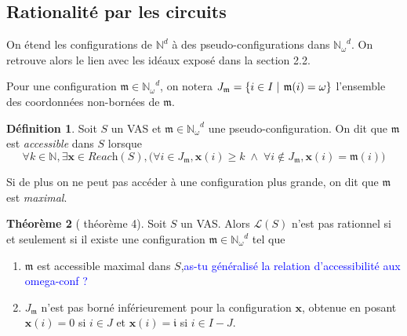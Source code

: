 \documentclass[a4paper,final]{article}
\theoremstyle{definition}
\newtheorem{Theorem}{Théorème}
\newtheorem{Definition}[Theorem]{Définition}
\let\geq\geqslant
\newcommand{\alain}[1]{\textcolor{blue}{#1}}
\newcommand{\set}[2]{\left\{#1\mathrel{\left|\vphantom{#1}\vphantom{#2}\right.}#2\right\}}
\newcommand{\os}[1]{\left\{\mathinner{#1}\right\}}
\newcommand{\N}{\ensuremath{\mathbb{N}}}
\newcommand{\Nomega}{\ensuremath{\mathbb{N}_\omega}}
\newcommand{\lang}{\ensuremath{\mathcal{L}}}
\newcommand{\reach}{\ensuremath{\textit{Reach}}}
\newcommand{\vect}[1]{\ensuremath{\mathbf{#1}}}
\begin{document}
\subsection{Rationalité par les circuits}



On étend les configurations de $\N^d$ à des pseudo-configurations dans $\Nomega^d$.
On retrouve alors le lien avec les idéaux exposé dans la section 2.2.

Pour une configuration $\mathfrak{m} \in \Nomega^d$, on notera $J_\mathfrak{m} = \set{i\in I}{\mathfrak{m}(i)=\omega}$ l'ensemble des coordonnées non-bornées de $\mathfrak{m}$.

\begin{Definition}
Soit $S$ un VAS et $\mathfrak{m} \in \Nomega^d$ une pseudo-configuration.
On dit que $\mathfrak{m}$ est \emph{accessible} dans $S$ lorsque
$$\forall k\in\N, \exists \vect{x}\in\reach(S), \big( \forall i\in J_\mathfrak{m}, \vect{x}(i) \geq k \;\land\; \forall i \notin J_\mathfrak{m}, \vect{x}(i) = \mathfrak{m}(i) \big)$$

Si de plus on ne peut pas accéder à une configuration  plus grande, on dit que $\mathfrak{m}$ est \emph{maximal}.
\end{Definition}

\begin{Theorem}[\cite{vavn81} théorème 4]
Soit $S$ un VAS.
Alors $\lang(S)$ n'est pas rationnel si et seulement si
il existe une configuration $\mathfrak{m} \in \Nomega^d$ tel que
\begin{enumerate}
    \item $\mathfrak{m}$ est accessible maximal dans $S$,\alain{as-tu généralisé la relation d'accessibilité aux omega-conf ?}
    \item $J_\mathfrak{m}$ n'est pas borné inférieurement pour la configuration $\vect{x}$, 
    obtenue en posant $\vect{x}(i) = 0$ si $i\in J$ et $\vect{x}(i) = \mathfrak{i}$ si $i\in I-J$.
\end{enumerate}
\end{Theorem}
\end{document}
